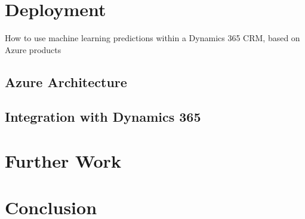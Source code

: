 \section{Deployment} \label{sec:crm-deployment}
How to use machine learning predictions within a Dynamics 365 CRM, based on Azure products

\subsection{Azure Architecture}
\lipsum[2]

\subsection{Integration with Dynamics 365}
\lipsum[3]


\section{Further Work} \label{sec:use-case-further-work}
\lipsum[1]

\section{Conclusion} \label{sec:use-case-conclusion}
\lipsum[1]